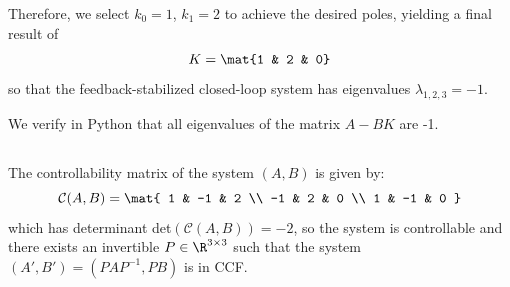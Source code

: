 \documentclass{homework}
\newcommand{\control}{\mathcal{C}}
\begin{document}
Therefore, we select $k_0 = 1$, $k_1=2$ to achieve the desired poles, yielding a final result of
\begin{equation*}
    K = \mat{1 & 2 & 0}
\end{equation*}
so that the feedback-stabilized closed-loop system has eigenvalues $\lambda_{1,2,3} = -1$.

We verify in Python that all eigenvalues of the matrix $A - BK$ are -1.

\subsection{}
\begin{letterenum}
\item The controllability matrix of the system $(A, B)$ is given by:
\begin{equation*}
    \control(A, B) = \mat{
        1 & -1 & 2 \\
        -1 & 2 & 0 \\
        1 & -1 & 0
    }
\end{equation*}
which has determinant det$(\control(A, B)) = -2$, so the system is controllable and
there exists an invertible $P\in\R^{3\times 3}$ such that the system $(A', B') = (PAP^{-1}, PB)$
is in CCF.


\end{letterenum}
\end{document}

